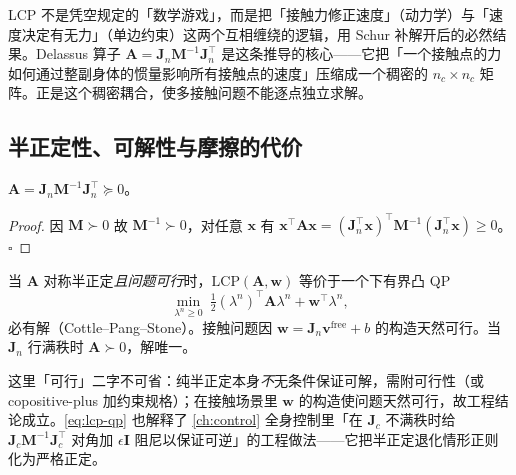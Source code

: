 \begin{insight}
LCP 不是凭空规定的「数学游戏」，而是把「接触力修正速度」（动力学）与「速度决定有无力」（单边约束）这两个互相缠绕的逻辑，用 Schur 补解开后的必然结果。Delassus 算子 $\mathbf{A}=\mathbf{J}_n\mathbf{M}^{-1}\mathbf{J}_n^\top$ 是这条推导的核心——它把「一个接触点的力如何通过整副身体的惯量影响所有接触点的速度」压缩成一个稠密的 $n_c\times n_c$ 矩阵。正是这个稠密耦合，使多接触问题不能逐点独立求解。
\end{insight}

\subsection{半正定性、可解性与摩擦的代价}
\label{subsec:lcp-psd}

\begin{proposition}
\label{prop:delassus-psd}
$\mathbf{A}=\mathbf{J}_n\mathbf{M}^{-1}\mathbf{J}_n^\top\succeq0$。
\end{proposition}
\begin{proof}
因 $\mathbf{M}\succ0$ 故 $\mathbf{M}^{-1}\succ0$，对任意 $\boldsymbol{x}$ 有 $\boldsymbol{x}^\top\mathbf{A}\boldsymbol{x}=(\mathbf{J}_n^\top\boldsymbol{x})^\top\mathbf{M}^{-1}(\mathbf{J}_n^\top\boldsymbol{x})\ge0$。$\square$
\end{proof}

\begin{theorem}
\label{thm:lcp-solvable}
当 $\mathbf{A}$ 对称半正定\emph{且问题可行}时，$\mathrm{LCP}(\mathbf{A},\boldsymbol{w})$ 等价于一个下有界凸 QP
\begin{equation}
  \min_{\lambda^n\ge0}\ \tfrac12(\lambda^n)^\top\mathbf{A}\lambda^n+\boldsymbol{w}^\top\lambda^n,
  \label{eq:lcp-qp}
\end{equation}
必有解（Cottle--Pang--Stone\cite{cottle1992linear}）。接触问题因 $\boldsymbol{w}=\mathbf{J}_n\boldsymbol{v}^{\mathrm{free}}+b$ 的构造天然可行。当 $\mathbf{J}_n$ 行满秩时 $\mathbf{A}\succ0$，解唯一。
\end{theorem}

\noindent 这里「可行」二字不可省：纯半正定本身\emph{不}无条件保证可解，需附可行性（或 copositive-plus 加约束规格）；在接触场景里 $\boldsymbol{w}$ 的构造使问题天然可行，故工程结论成立。\cref{eq:lcp-qp} 也解释了 \cref{ch:control} 全身控制里「在 $\mathbf{J}_c$ 不满秩时给 $\mathbf{J}_c\mathbf{M}^{-1}\mathbf{J}_c^\top$ 对角加 $\epsilon\mathbf{I}$ 阻尼以保证可逆」的工程做法——它把半正定退化情形正则化为严格正定。

